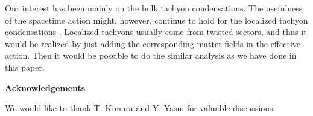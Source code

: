 \documentclass[a4paper,a4paper]{article}
\begin{document}
\vspace{3mm}

Our interest has been mainly on the bulk tachyon condensations. 
The usefulness of the spacetime action might, however, continue to hold for the localized tachyon condensations 
\cite{localized}. 
Localized tachyons usually come from twisted sectors, and thus it would be realized by just adding the 
corresponding matter fields in the effective action. 
Then it would be possible to do the similar analysis as we have done in this paper. 

\vspace{2cm}

{\bf {\Large Acknowledgements}}

\vspace{5mm}

We would like to thank T. Kimura and Y. Yasui for valuable discussions. 


















\newpage
\end{document}
